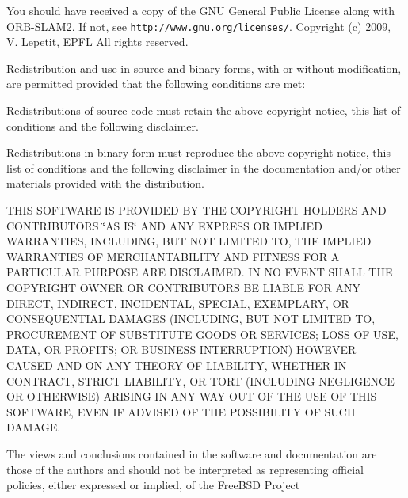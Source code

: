 You should have received a copy of the G\-N\-U General Public License along with O\-R\-B-\/\-S\-L\-A\-M2. If not, see \href{http://www.gnu.org/licenses/}{\tt http\-://www.\-gnu.\-org/licenses/}. Copyright (c) 2009, V. Lepetit, E\-P\-F\-L All rights reserved.

Redistribution and use in source and binary forms, with or without modification, are permitted provided that the following conditions are met\-:


\begin{DoxyEnumerate}
\item Redistributions of source code must retain the above copyright notice, this list of conditions and the following disclaimer.
\item Redistributions in binary form must reproduce the above copyright notice, this list of conditions and the following disclaimer in the documentation and/or other materials provided with the distribution.
\end{DoxyEnumerate}

T\-H\-I\-S S\-O\-F\-T\-W\-A\-R\-E I\-S P\-R\-O\-V\-I\-D\-E\-D B\-Y T\-H\-E C\-O\-P\-Y\-R\-I\-G\-H\-T H\-O\-L\-D\-E\-R\-S A\-N\-D C\-O\-N\-T\-R\-I\-B\-U\-T\-O\-R\-S \char`\"{}\-A\-S I\-S\char`\"{} A\-N\-D A\-N\-Y E\-X\-P\-R\-E\-S\-S O\-R I\-M\-P\-L\-I\-E\-D W\-A\-R\-R\-A\-N\-T\-I\-E\-S, I\-N\-C\-L\-U\-D\-I\-N\-G, B\-U\-T N\-O\-T L\-I\-M\-I\-T\-E\-D T\-O, T\-H\-E I\-M\-P\-L\-I\-E\-D W\-A\-R\-R\-A\-N\-T\-I\-E\-S O\-F M\-E\-R\-C\-H\-A\-N\-T\-A\-B\-I\-L\-I\-T\-Y A\-N\-D F\-I\-T\-N\-E\-S\-S F\-O\-R A P\-A\-R\-T\-I\-C\-U\-L\-A\-R P\-U\-R\-P\-O\-S\-E A\-R\-E D\-I\-S\-C\-L\-A\-I\-M\-E\-D. I\-N N\-O E\-V\-E\-N\-T S\-H\-A\-L\-L T\-H\-E C\-O\-P\-Y\-R\-I\-G\-H\-T O\-W\-N\-E\-R O\-R C\-O\-N\-T\-R\-I\-B\-U\-T\-O\-R\-S B\-E L\-I\-A\-B\-L\-E F\-O\-R A\-N\-Y D\-I\-R\-E\-C\-T, I\-N\-D\-I\-R\-E\-C\-T, I\-N\-C\-I\-D\-E\-N\-T\-A\-L, S\-P\-E\-C\-I\-A\-L, E\-X\-E\-M\-P\-L\-A\-R\-Y, O\-R C\-O\-N\-S\-E\-Q\-U\-E\-N\-T\-I\-A\-L D\-A\-M\-A\-G\-E\-S (I\-N\-C\-L\-U\-D\-I\-N\-G, B\-U\-T N\-O\-T L\-I\-M\-I\-T\-E\-D T\-O, P\-R\-O\-C\-U\-R\-E\-M\-E\-N\-T O\-F S\-U\-B\-S\-T\-I\-T\-U\-T\-E G\-O\-O\-D\-S O\-R S\-E\-R\-V\-I\-C\-E\-S; L\-O\-S\-S O\-F U\-S\-E, D\-A\-T\-A, O\-R P\-R\-O\-F\-I\-T\-S; O\-R B\-U\-S\-I\-N\-E\-S\-S I\-N\-T\-E\-R\-R\-U\-P\-T\-I\-O\-N) H\-O\-W\-E\-V\-E\-R C\-A\-U\-S\-E\-D A\-N\-D O\-N A\-N\-Y T\-H\-E\-O\-R\-Y O\-F L\-I\-A\-B\-I\-L\-I\-T\-Y, W\-H\-E\-T\-H\-E\-R I\-N C\-O\-N\-T\-R\-A\-C\-T, S\-T\-R\-I\-C\-T L\-I\-A\-B\-I\-L\-I\-T\-Y, O\-R T\-O\-R\-T (I\-N\-C\-L\-U\-D\-I\-N\-G N\-E\-G\-L\-I\-G\-E\-N\-C\-E O\-R O\-T\-H\-E\-R\-W\-I\-S\-E) A\-R\-I\-S\-I\-N\-G I\-N A\-N\-Y W\-A\-Y O\-U\-T O\-F T\-H\-E U\-S\-E O\-F T\-H\-I\-S S\-O\-F\-T\-W\-A\-R\-E, E\-V\-E\-N I\-F A\-D\-V\-I\-S\-E\-D O\-F T\-H\-E P\-O\-S\-S\-I\-B\-I\-L\-I\-T\-Y O\-F S\-U\-C\-H D\-A\-M\-A\-G\-E.

The views and conclusions contained in the software and documentation are those of the authors and should not be interpreted as representing official policies, either expressed or implied, of the Free\-B\-S\-D Project 